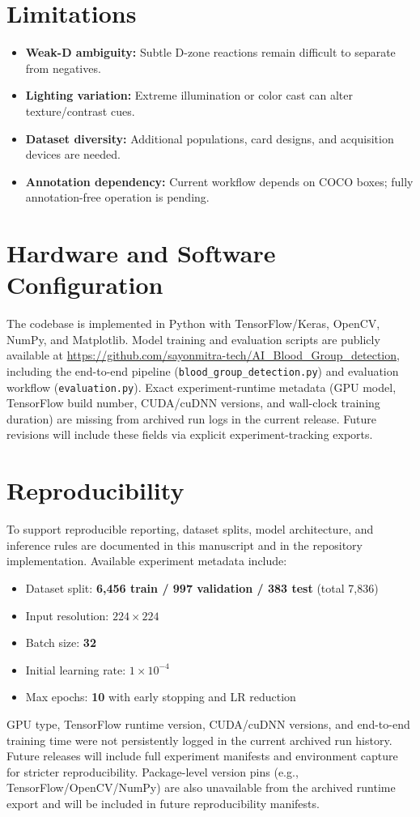 \documentclass[conference]{IEEEtran}
\begin{document}
\section{Limitations}
\begin{itemize}
  \item \textbf{Weak-D ambiguity:} Subtle D-zone reactions remain difficult to separate from negatives.
  \item \textbf{Lighting variation:} Extreme illumination or color cast can alter texture/contrast cues.
  \item \textbf{Dataset diversity:} Additional populations, card designs, and acquisition devices are needed.
  \item \textbf{Annotation dependency:} Current workflow depends on COCO boxes; fully annotation-free operation is pending.
\end{itemize}

\section{Hardware and Software Configuration}
The codebase is implemented in Python with TensorFlow/Keras, OpenCV, NumPy, and Matplotlib. Model training and evaluation scripts are publicly available at \url{https://github.com/sayonmitra-tech/AI_Blood_Group_detection}, including the end-to-end pipeline (\texttt{blood\_group\_detection.py}) and evaluation workflow (\texttt{evaluation.py}). Exact experiment-runtime metadata (GPU model, TensorFlow build number, CUDA/cuDNN versions, and wall-clock training duration) are missing from archived run logs in the current release. Future revisions will include these fields via explicit experiment-tracking exports.

\section{Reproducibility}
To support reproducible reporting, dataset splits, model architecture, and inference rules are documented in this manuscript and in the repository implementation. Available experiment metadata include:
\begin{itemize}
  \item Dataset split: \textbf{6,456 train / 997 validation / 383 test} (total 7,836)
  \item Input resolution: \textbf{$224\times224$}
  \item Batch size: \textbf{32}
  \item Initial learning rate: \textbf{$1\times10^{-4}$}
  \item Max epochs: \textbf{10} with early stopping and LR reduction
\end{itemize}
GPU type, TensorFlow runtime version, CUDA/cuDNN versions, and end-to-end training time were not persistently logged in the current archived run history. Future releases will include full experiment manifests and environment capture for stricter reproducibility.
Package-level version pins (e.g., TensorFlow/OpenCV/NumPy) are also unavailable from the archived runtime export and will be included in future reproducibility manifests.
\end{document}
